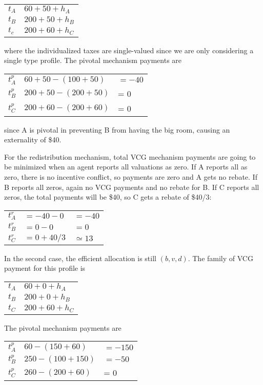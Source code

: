 \documentclass[10pt]{article}
\begin{document}
\begin{spacing}{1.0}
\begin{enumerate}
  \begin{tabular}{ll}
    $t_A$ & $60 + 50 + h_A$ \\
    $t_B$ & $200 + 50 + h_B$ \\
    $t_c$ & $200 + 60 + h_C$
  \end{tabular}

  where the individualized taxes are single-valued since we are only
  considering a single type profile. The pivotal mechanism payments are

  \begin{tabular}{lll}
    $t_A^p$ & $60 + 50  - (100 + 50)$ & $= -40$ \\
    $t_B^p$ & $200 + 50 - (200 + 50)$ &= 0 \\
    $t_C^p$ & $200 + 60 - (200 + 60)$ &= 0
  \end{tabular}

  since A is pivotal in preventing B from having the big room, causing an
  externality of \$40.

  For the redistribution mechanism, total VCG mechanism payments are going
  to be minimized when an agent reports all valuations as zero. If A
  reports all as zero, there is no incentive conflict, so payments are
  zero and A gets no rebate. If B reports all zeros, again no VCG payments
  and no rebate for B. If C reports all zeros, the total payments will
  be \$40, so C gets a rebate of \$40/3:

  \begin{tabular}{lll}
    $t_A^r$ & $= -40 - 0$ & $=-40$ \\
    $t_B^r$ & $= 0 - 0$ & $=0$ \\
    $t_C^r$ & $= 0 + 40/3$ & $\simeq 13$
  \end{tabular}

  In the second case, the efficient allocation is still $(b, v, d)$. The
  family of VCG payment for this profile is

  \begin{tabular}{ll}
    $t_A$ & $60 + 0 + h_A$ \\
    $t_B$ & $200 + 0 + h_B$ \\
    $t_C$ & $200 + 60 + h_C$
  \end{tabular}

  The pivotal mechanism payments are

  \begin{tabular}{lll}
    $t_A^p$ & $60 - (150 + 60)$ & $= -150$ \\
    $t_B^p$ & $250 - (100 + 150)$ & $= -50$ \\
    $t_C^p$ & $260 - (200 + 60)$ &= 0
  \end{tabular}


\end{enumerate}
\end{spacing}
\end{document}
